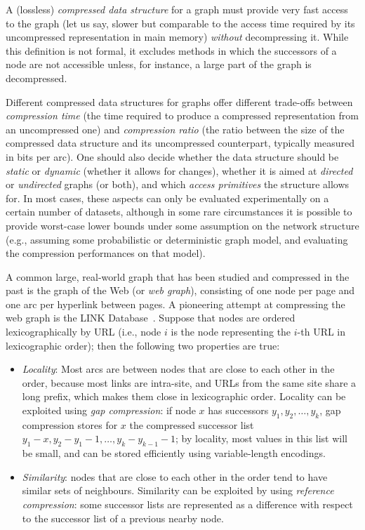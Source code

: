 A (lossless) \emph{compressed data structure} for a graph must provide very
fast access to the graph (let us say, slower but comparable to the access time
required by its uncompressed representation in main memory) \emph{without}
decompressing it.  While this definition is not formal, it excludes methods in
which the successors of a node are not accessible unless, for instance, a large
part of the graph is decompressed.

Different compressed data structures for graphs offer different trade-offs
between \emph{compression time} (the time required to produce a compressed
representation from an uncompressed one) and \emph{compression ratio} (the
ratio between the size of the compressed data structure and its uncompressed
counterpart, typically measured in bits per arc). One should also decide
whether the data structure should be \emph{static} or \emph{dynamic} (whether
it allows for changes), whether it is aimed at \emph{directed} or
\emph{undirected} graphs (or both), and which \emph{access primitives} the
structure allows for.  In most cases, these aspects can only be evaluated
experimentally on a certain number of datasets, although in some rare
circumstances it is possible to provide worst-case lower bounds under some
assumption on the network structure (e.g., assuming some probabilistic or
deterministic graph model, and evaluating the compression performances on that
model).

A common large, real-world graph that has been studied and compressed in the
past is the graph of the Web (or \emph{web graph}), consisting of one node per
page and one arc per hyperlink between pages.  A pioneering attempt at
compressing the web graph is the LINK Database~\cite{RSWLD}. Suppose that nodes
are ordered lexicographically by URL (i.e., node $i$ is the node representing
the $i$-th URL in lexicographic order); then the following two properties are
true:
\begin{itemize}

\item \emph{Locality}: Most arcs are between nodes that are close to each other
  in the order, because most links are intra-site, and URLs from the same site
  share a long prefix, which makes them close in lexicographic order.  Locality
  can be exploited using \emph{gap compression}: if node $x$ has successors
  $y_1, y_2, \dots, y_k$, gap compression stores for $x$ the compressed
  successor list $y_1-x,y_2-y_1-1,\dots,y_k-y_{k-1}-1$; by locality, most
  values in this list will be small, and can be stored efficiently using
  variable-length encodings.

\item \emph{Similarity}: nodes that are close to each other in the order tend
  to have similar sets of neighbours. Similarity can be exploited by using
  \emph{reference compression}: some successor lists are represented as a
  difference with respect to the successor list of a previous nearby node.

\end{itemize}

